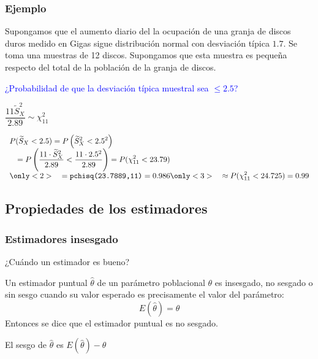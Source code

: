 \documentclass[12pt,t]{beamer}\usepackage[]{graphicx}\usepackage[]{color}
\newcommand{\blue}[1]{\textcolor{blue}{#1}}
\renewcommand{\emph}[1]{{\color{red}#1}}
\renewcommand{\leq}{\leqslant}
\theoremstyle{plain}
\theoremstyle{definition}
\begin{document}
\begin{frame}
\frametitle{Ejemplo}
\vspace*{-2ex}

Supongamos que  el  aumento  diario del la ocupación de una granja de  discos duros medido  en Gigas sigue distribución normal con desviación típica $1.7$. Se toma una muestras de 12 discos. Supongamos que esta  muestra es pequeña respecto del total de la población de la granja de discos.
\medskip

\blue{¿Probabilidad de que la desviación típica muestral
sea $\leq 2.5$?}
\medskip

$\dfrac{11\widetilde{S}_{X}^2}{2.89}\sim \chi^2_{11}$
\medskip

$\begin{array}{l}
\displaystyle P(\widetilde{S}_{X}<2.5)= P\left(\widetilde{S}_{X}^2<2.5^2\right)\\
\quad \displaystyle =P\left(\frac{11\cdot \widetilde{S}_{X}^2}{2.89}<\frac{11
\cdot 2.5^2}{2.89}\right)= P(\chi_{11}^2<23.79)\\
\only<2>{\quad\displaystyle=\mbox{\texttt{pchisq(23.7889,11)}}=0.986}
\only<3>{\quad \displaystyle \approx P(\chi_{11}^2<24.725)=0.99}
\end{array}$
        
\end{frame}


\subsection{Propiedades de los estimadores}


\begin{frame}
\frametitle{Estimadores insesgado}

¿Cuándo un estimador es bueno?
\medskip

Un estimador puntual $\widehat{\theta}$ de un parámetro  poblacional
$\theta$ es  \emph{insesgado, no sesgado o sin sesgo} cuando su valor esperado es precisamente el valor del parámetro:
$$
E(\widehat{\theta})=\theta
$$ 
Entonces se dice que el estimador puntual es \emph{no sesgado}.
\medskip

El  \emph{sesgo} de $\widehat{\theta}$ es $E(\widehat{\theta})-\theta$

\end{frame}
\end{document}
